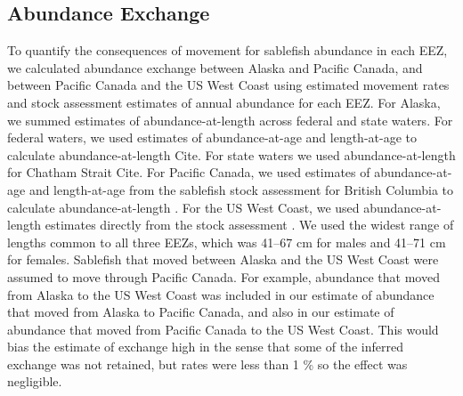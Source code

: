 \documentclass{article}
\newcommand{\lr}[1]{{\color{blue}#1}}
\begin{document}
\subsection{Abundance Exchange}
To quantify the consequences of movement for sablefish abundance in each EEZ, we calculated abundance exchange between Alaska and Pacific Canada, and between Pacific Canada and the US West Coast using estimated movement rates and stock assessment estimates of annual abundance for each EEZ. For Alaska, we summed estimates of abundance-at-length across federal and state waters. For federal waters, we used estimates of abundance-at-age and length-at-age to calculate abundance-at-length \lr{Cite}. For state waters we used abundance-at-length for Chatham Strait \lr{Cite}. For Pacific Canada, we used estimates of abundance-at-age and length-at-age from the sablefish stock assessment for British Columbia to calculate abundance-at-length \cite[]{dfo2020}. For the US West Coast, we used abundance-at-length estimates directly from the stock assessment \cite[]{haltuch2019}. We used the widest range of lengths common to all three EEZs, which was \num{41}--\num{67} cm for males and \num{41}--\num{71} cm for females. Sablefish that moved between Alaska and the US West Coast were assumed to move through Pacific Canada. For example, abundance that moved from Alaska to the US West Coast was included in our estimate of abundance that moved from Alaska to Pacific Canada, and also in our estimate of abundance that moved from Pacific Canada to the US West Coast. This would bias the estimate of exchange high in the sense that some of the inferred exchange was not retained, but rates were less than 1 \% so the effect was negligible.
\end{document}
